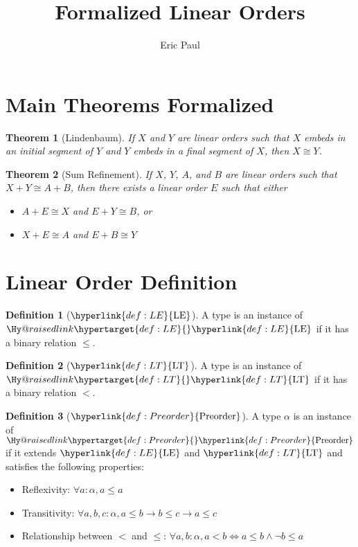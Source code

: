 \documentclass{article}
\title{Formalized Linear Orders}
\author{Eric Paul}
\date{}
\makeatletter
\newcommand\newlink[2]{{\protect\hyperlink{#1}{\normalcolor #2}}}
\newcommand\newtarget[2]{\Hy@raisedlink{\hypertarget{#1}{}}#2}
\newtheorem{theorem}{Theorem}
\theoremstyle{definition}
\newtheorem{definition}{Definition}
\newcommand{\iso}{\cong}
\makeatother
\begin{document}
\maketitle

\section*{Main Theorems Formalized}
\begin{theorem}[Lindenbaum]
If $X$ and $Y$ are linear orders such that $X$ embeds in an initial segment of $Y$ and $Y$ embeds in a final segment of $X$, then $X \iso Y$.
\end{theorem}

\begin{theorem}[Sum Refinement]
If $X$, $Y$, $A$, and $B$ are linear orders such that $X + Y \iso A+B$, then there exists a linear order $E$ such that either
\begin{itemize}
\item $A + E \iso X$ and $E + Y \iso B$, or
\item $X + E \iso A$ and $E + B \iso Y$
\end{itemize}
\end{theorem}

\section*{Linear Order Definition}
\newcommand\LE{\newlink{def:LE}{\text{LE}}}
\begin{definition}[$\LE$]
A type is an instance of $\newtarget{def:LE}{\LE}$ if it has a binary relation $\le$.
\end{definition}

\newcommand\LT{\newlink{def:LT}{\text{LT}}}
\begin{definition}[$\LT$]
A type is an instance of $\newtarget{def:LT}{\LT}$ if it has a binary relation $<$.
\end{definition}

\newcommand\Preorder{\newlink{def:Preorder}{\text{Preorder}}}
\begin{definition}[$\Preorder$]
A type $\alpha$ is an instance of $\newtarget{def:Preorder}{\Preorder}$ if it extends $\LE$ and $\LT$ and satisfies the following properties:
\begin{itemize}
\item Reflexivity: $\forall a : \alpha, a \le a$
\item Transitivity: $\forall a,b,c : \alpha, a\le b \to b\le c \to a\le c$
\item Relationship between $<$ and $\le$: $\forall a,b : \alpha, a < b \iff a\le b \land \neg b \le a$
\end{itemize}
\end{definition}
\end{document}
